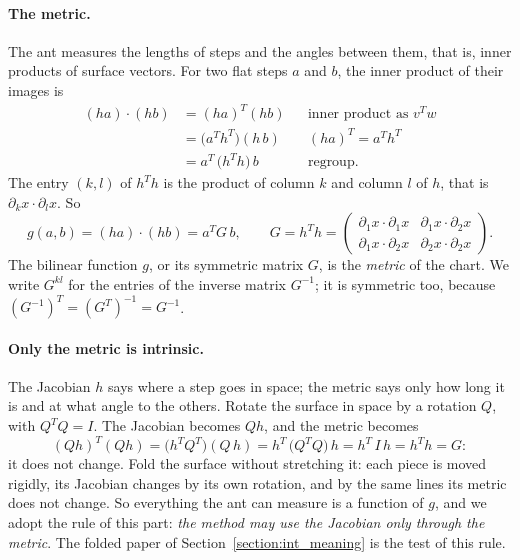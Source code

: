 \paragraph{The metric.} The ant measures the lengths of steps and the angles between them, that is, inner products of surface vectors. For two flat steps $a$ and $b$, the inner product of their images is
\begin{align*}
(h a)\cdot(h b) &= (ha)^T (hb) && \text{inner product as } v^T w \\
&= \big(a^T h^T\big)(h\, b) && (ha)^T = a^T h^T \\
&= a^T\, \big(h^T h\big)\, b && \text{regroup.}
\end{align*}
The entry $(k, l)$ of $h^T h$ is the product of column $k$ and column $l$ of $h$, that is $\partial_kx\cdot\partial_lx$. So
\begin{equation}
\label{eqn:r3_metric}
g(a, b) = (ha)\cdot(hb) = a^T G\, b, \qquad G = h^T h = \begin{pmatrix} \partial_1x\cdot\partial_1x & \partial_1x\cdot\partial_2x \\ \partial_1x\cdot\partial_2x & \partial_2x\cdot\partial_2x \end{pmatrix}.
\end{equation}
The bilinear function $g$, or its symmetric matrix $G$, is the \emph{metric} of the chart. We write $G^{kl}$ for the entries of the inverse matrix $G^{-1}$; it is symmetric too, because $(G^{-1})^T = (G^T)^{-1} = G^{-1}$.

\paragraph{Only the metric is intrinsic.} The Jacobian $h$ says where a step goes in space; the metric says only how long it is and at what angle to the others. Rotate the surface in space by a rotation $Q$, with $Q^T Q = I$. The Jacobian becomes $Qh$, and the metric becomes
\begin{equation*}
(Qh)^T(Qh) = \big(h^T Q^T\big)(Q\, h) = h^T\,\big(Q^T Q\big)\, h = h^T\, I\, h = h^T h = G :
\end{equation*}
it does not change. Fold the surface without stretching it: each piece is moved rigidly, its Jacobian changes by its own rotation, and by the same lines its metric does not change. So everything the ant can measure is a function of $g$, and we adopt the rule of this part: \emph{the method may use the Jacobian only through the metric}. The folded paper of Section~\ref{section:int_meaning} is the test of this rule.

